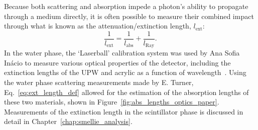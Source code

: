 Because both scattering and absorption impede a photon's ability to propagate through a medium directly, it is often possible to measure their combined impact through what is known as the attenuation/extinction length, $l_{\mathrm{ext}}$:
\begin{equation}\label{eq:ext_length_def}
    \frac{1}{l_{\mathrm{ext}}} = \frac{1}{l_{\mathrm{abs}}} + \frac{1}{l_{\mathrm{Ray}}}.
\end{equation}
In the water phase, the `Laserball' calibration system was used by Ana Sofia In\'{a}cio to measure various optical properties of the detector, including the extinction lengths of the UPW and acrylic as a function of wavelength~\cite{andersonOpticalCalibrationSNO2021,inacioDataAnalysisWater2022}. Using the water phase scattering measurements made by E. Turner, Eq.~\ref{eq:ext_length_def} allowed for the estimation of the absorption lengths of these two materials, shown in Figure~\ref{fig:abs_lengths_optics_paper}. Measurements of the extinction length in the scintillator phase is discussed in detail in Chapter~\ref{chap:smellie_analysis}.

